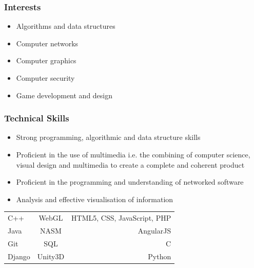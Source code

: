 \documentclass{article}
\begin{document}
	\subsubsection{Interests}
		\begin{itemize}
			\item Algorithms and data structures
			\item Computer networks
			\item Computer graphics
			\item Computer security
			\item Game development and design
		\end{itemize}
	\subsubsection{Technical Skills}
		\begin{itemize}
			\item Strong programming, algorithmic and data structure skills
			\item Proficient in the use of multimedia i.e. the combining of computer science, visual design and multimedia to create a complete and coherent product
			\item Proficient in the programming and understanding of networked software
			\item Analysis and effective visualisation of information
		\end{itemize}
		\begin{tabular}{| l | c | r |}
			C++		& WebGL		& HTML5, CSS, JavaScript, PHP   	\\
			Java    & NASM     	& AngularJS							\\
			Git 	& SQL     	& C									\\
			Django 	& Unity3D 	& Python                     
		\end{tabular}
		
\end{document}
